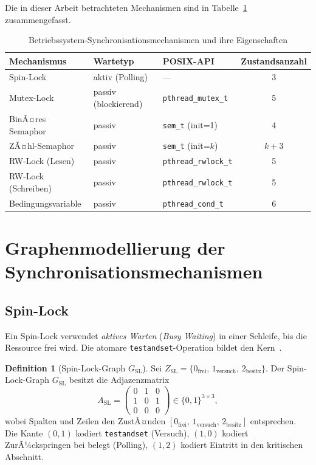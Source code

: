 ﻿\documentclass[a4paper,12pt]{article}
\theoremstyle{definition}
\newtheorem{definition}{Definition}
\begin{document}
Die in dieser Arbeit betrachteten Mechanismen sind in
Tabelle~\ref{tab:mech} zusammengefasst.

\begin{table}[H]
  \centering
  \caption{Betriebssystem-Synchronisationsmechanismen und ihre Eigenschaften}
  \label{tab:mech}
  \begin{tabular}{lllc}
    \toprule
    Mechanismus & Wartetyp & POSIX-API & Zustandsanzahl\\
    \midrule
    Spin-Lock & aktiv (Polling) & ---                       & 3 \\
    Mutex-Lock & passiv (blockierend) & \texttt{pthread\_mutex\_t} & 5 \\
    BinÃ¤res Semaphor & passiv & \texttt{sem\_t} (init=1)   & 4 \\
    ZÃ¤hl-Semaphor & passiv & \texttt{sem\_t} (init=$k$)   & $k{+}3$ \\
    RW-Lock (Lesen) & passiv & \texttt{pthread\_rwlock\_t} & 5 \\
    RW-Lock (Schreiben) & passiv & \texttt{pthread\_rwlock\_t} & 5 \\
    Bedingungsvariable & passiv & \texttt{pthread\_cond\_t} & 6 \\
    \bottomrule
  \end{tabular}
\end{table}

\section{Graphenmodellierung der Syn\-chro\-ni\-sa\-tions\-me\-cha\-nis\-men}
\label{sec:modellierung}

\subsection{Spin-Lock}

Ein Spin-Lock verwendet \emph{aktives Warten} (\emph{Busy Waiting}) in einer
Schleife, bis die Ressource frei wird.
Die atomare \texttt{testandset}-Operation bildet den Kern~\cite{herlihy2008art}.

\begin{definition}[Spin-Lock-Graph $G_{\mathrm{SL}}$]
  \label{def:sl}
  Sei $Z_{\mathrm{SL}} = \{0_{\mathrm{frei}},\, 1_{\mathrm{versuch}},\, 2_{\mathrm{besitz}}\}$.
  Der Spin-Lock-Graph $G_{\mathrm{SL}}$ besitzt die Adjazenzmatrix
  \[
    A_{\mathrm{SL}} =
    \begin{pmatrix}
      0 & 1 & 0 \\
      1 & 0 & 1 \\
      0 & 0 & 0
    \end{pmatrix}
    \in \{0,1\}^{3 \times 3},
  \]
  wobei Spalten und Zeilen den ZustÃ¤nden
  $[0_{\mathrm{frei}},\, 1_{\mathrm{versuch}},\, 2_{\mathrm{besitz}}]$
  entsprechen.
  Die Kante $(0, 1)$ kodiert \texttt{testandset} (Versuch),
  $(1, 0)$ kodiert ZurÃ¼ckspringen bei belegt (Polling),
  $(1, 2)$ kodiert Eintritt in den kritischen Abschnitt.
\end{definition}
\end{document}

